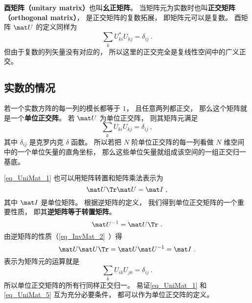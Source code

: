 
\begin{issues}
\issueDraft
{}
\end{issues}

\textbf{酉矩阵（unitary matrix）}也叫\textbf{幺正矩阵}。 当矩阵元为实数时也叫\textbf{正交矩阵（orthogonal matrix）}， 是正交矩阵的复数拓展， 即矩阵元可以是复数。 酉矩阵 $\mat U$ 的定义同样为
\begin{equation}
\sum_k U_{ki}^* U_{kj} = \delta_{ij}~.
\end{equation}
但由于复数的列矢量没有对应的， 所以这里的正交完全是复线性空间中的广义正交。

\subsection{实数的情况}


若一个实数方阵的每一列的模长都等于 $1$， 且任意两列都正交， 那么这个矩阵就是一个\textbf{单位正交阵}。 若 $\mat U$ 为单位正交阵， 则其矩阵元满足
\begin{equation}\label{eq_UniMat_1}
\sum_k U_{ki} U_{kj} = \delta_{ij}~,
\end{equation}
其中 $\delta_{ij}$ 是克罗内克 $\delta$ 函数。 所以若把 $N$ 阶单位正交阵的每一列看做 $N$ 维空间中的一个单位矢量的直角坐标， 那么这些单位矢量就组成该空间的一组正交归一基底。

\autoref{eq_UniMat_1} 也可以用矩阵转置和矩阵乘法表示为
\begin{equation}
\mat U\Tr \mat U = \mat I~,
\end{equation}
其中 $\mat I$ 是单位矩阵。 根据逆矩阵的定义， 我们得到单位正交矩阵的一个重要性质， 即其\textbf{逆矩阵等于转置矩阵}。
\begin{equation}\label{eq_UniMat_2}
\mat U^{-1} = \mat U\Tr~.
\end{equation}
由逆矩阵的性质（\autoref{eq_InvMat_2}~）得
\begin{equation}
\mat U \mat U\Tr = \mat U \mat U^{-1} = \mat I~.
\end{equation}
表示为矩阵元的运算就是
\begin{equation}\label{eq_UniMat_5}
\sum_k U_{ik} U_{jk} = \delta_{ij}~.
\end{equation}
所以单位正交矩阵的所有行同样正交归一。 易证\autoref{eq_UniMat_1} 和\autoref{eq_UniMat_5} 互为充分必要条件， 都可以作为单位正交阵的定义。


